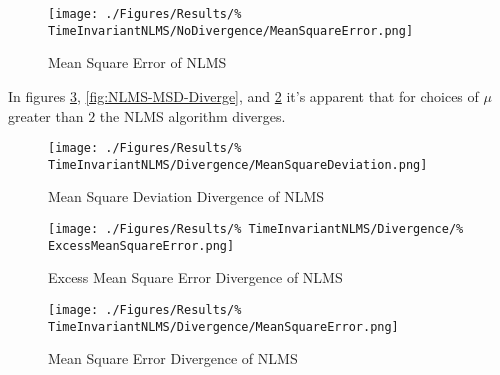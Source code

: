 \begin{figure}[ht]
	\centering
	\texttt{[image: ./Figures/Results/\%
	TimeInvariantNLMS/NoDivergence/MeanSquareError.png]}
	\captionsetup{width=0.75\linewidth}
	\caption{Mean Square Error of NLMS}
	\label{fig:NLMS-MSE}
\end{figure}
In figures \ref{fig:NLMS-MSE-Diverge}, \ref{fig:NLMS-MSD-Diverge}, %
and \ref{fig:NLMS-EMSE-Diverge} it's apparent that %
for choices of $\mu$ greater than $2$ the NLMS algorithm diverges.
\begin{figure}[ht]
	\centering
	\begin{minipage}{0.49\textwidth}
		\centering
		\texttt{[image: ./Figures/Results/\%
		TimeInvariantNLMS/Divergence/MeanSquareDeviation.png]}
		\captionsetup{width=0.75\linewidth}
		\caption{Mean Square Deviation Divergence of NLMS}
		\label{fig:NLMS-MSD-Diverge}
	\end{minipage}
	\begin{minipage}{0.49\textwidth}
		\centering
		\texttt{[image: ./Figures/Results/\%
		TimeInvariantNLMS/Divergence/\%
		ExcessMeanSquareError.png]}
		\captionsetup{width=0.75\linewidth}
		\caption{Excess Mean Square Error Divergence of NLMS}
		\label{fig:NLMS-EMSE-Diverge}
	\end{minipage}
\end{figure}
\begin{figure}[ht]
	\centering
	\texttt{[image: ./Figures/Results/\%
	TimeInvariantNLMS/Divergence/MeanSquareError.png]}
	\captionsetup{width=0.75\linewidth}
	\caption{Mean Square Error Divergence of NLMS}
	\label{fig:NLMS-MSE-Diverge}
\end{figure}

